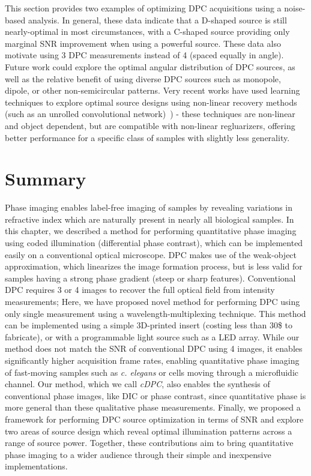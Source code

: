 This section provides two examples of optimizing DPC acquisitions using a noise-based analysis. In general, these data indicate that a D-shaped source is still nearly-optimal in most circumstances, with a C-shaped source providing only marginal SNR improvement when using a powerful source. These data also motivate using 3 DPC measurements instead of 4 (spaced equally in angle). Future work could explore the optimal angular distribution of DPC sources, as well as the relative benefit of using diverse DPC sources such as monopole, dipole, or other non-semicircular patterns. Very recent works have used learning techniques to explore optimal source designs using non-linear recovery methods (such as an unrolled convolutional network)~\cite{kellman2019physics}) - these techniques are non-linear and object dependent, but are compatible with non-linear regluarizers, offering better performance for a specific class of samples with slightly less generality.

\section{Summary}
Phase imaging enables label-free imaging of samples by revealing variations in refractive index which are naturally present in nearly all biological samples. In this chapter, we described a method for performing quantitative phase imaging using coded illumination (differential phase contrast), which can be implemented easily on a conventional optical microscope. DPC makes use of the weak-object approximation, which linearizes the image formation process, but is less valid for samples having a strong phase gradient (steep or sharp features). Conventional DPC requires 3 or 4 images to recover the full optical field from intensity measurements; Here, we have proposed novel method for performing DPC using only single measurement using a wavelength-multiplexing technique. This method can be implemented using a simple 3D-printed insert (costing less than 30\$ to fabricate), or with a programmable light source such as a LED array. While our method does not match the SNR of conventional DPC using 4 images, it enables significantly higher acquisition frame rates, enabling quantitative phase imaging of fast-moving samples such as \textit{c. elegans} or cells moving through a microfluidic channel. Our method, which we call \textit{cDPC}, also enables the synthesis of conventional phase images, like DIC or phase contrast, since quantitative phase is more general than these qualitative phase measurements. Finally, we proposed a framework for performing DPC source optimization in terms of SNR and explore two areas of source design which reveal optimal illumination patterns across a range of source power. Together, these contributions aim to bring quantitative phase imaging to a wider audience through their simple and inexpensive implementations.
